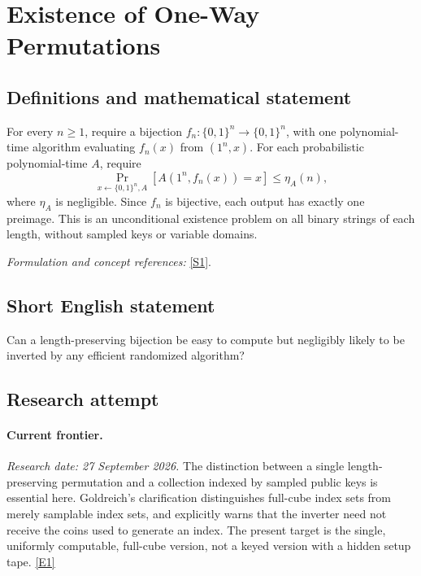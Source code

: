 \documentclass[11pt,a4paper]{article}
\newcommand{\sref}[2]{\hyperlink{source:#1:#2}{[S#2]}}
\newcommand{\eref}[2]{\hyperlink{extra:#1:#2}{[E#2]}}
\newif\ifshowcatalogue
\newcommand{\cataloguescope}[1]{\ifshowcatalogue
 \paragraph{Exact scope in the supplied catalogue.}
 \begin{quote}\small #1\end{quote}\fi}
\numberwithin{equation}{section}
\begin{document}
\setcounter{section}{0}
\clearpage
\section*{\texorpdfstring{Existence of One-Way Permutations}{Existence of One-Way Permutations}}\label{statement}
\subsection{Definitions and mathematical statement}
For every $n\ge1$, require a bijection $f_n:\{0,1\}^n\to\{0,1\}^n$, with one polynomial-time algorithm evaluating $f_n(x)$ from $(1^n,x)$. For each probabilistic polynomial-time $A$, require
\[
 \Pr_{x\leftarrow\{0,1\}^n,A}[A(1^n,f_n(x))=x]\le\eta_A(n),
\]
where $\eta_A$ is negligible. Since $f_n$ is bijective, each output has exactly one preimage. This is an unconditional existence problem on all binary strings of each length, without sampled keys or variable domains.
\par\smallskip\textit{Formulation and concept references:} \sref{statement}{1}.
\cataloguescope{There exists a family f\_n:\{0,1\}\textasciicircum{}n->\{0,1\}\textasciicircum{}n, n>=1, of bijections computed by one deterministic polynomial-time algorithm on (1\textasciicircum{}n,x), such that for every probabilistic polynomial-time algorithm A its inversion success Pr[A(1\textasciicircum{}n,f\_n(x))=x], over uniform x and A's coins, is negligible in n: for every c>0 it is at most n\textasciicircum{}(-c) for all sufficiently large n. This is unconditional existence in the classical unrelativized model, with no key sampling or variable domains.}
\subsection{Short English statement}
Can a length-preserving bijection be easy to compute but negligibly likely to be inverted by any efficient randomized algorithm?
\subsection{Research attempt}

\paragraph{Current frontier.}
\textit{Research date: 27 September 2026.}
The distinction between a single length-preserving permutation and a
collection indexed by sampled public keys is essential here. Goldreich's
clarification distinguishes full-cube index sets from merely samplable
index sets, and explicitly warns that the inverter need not receive the
coins used to generate an index. The present target is the single,
uniformly computable, full-cube version, not a keyed version with a hidden
setup tape. \eref{statement}{1}
\end{document}
